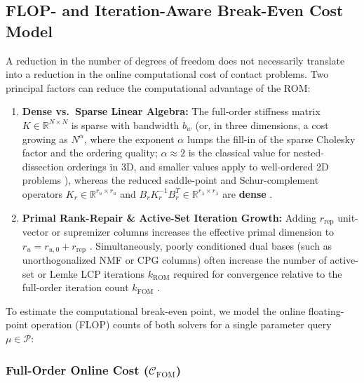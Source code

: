 \documentclass[11pt,a4paper]{article}
\providecommand{\tightlist}{\setlength{\itemsep}{0pt}\setlength{\parskip}{0pt}}
\begin{document}
\hypertarget{flop--and-iteration-aware-break-even-cost-model}{%
\subsection{FLOP- and Iteration-Aware Break-Even Cost Model}\label{flop--and-iteration-aware-break-even-cost-model}}

A reduction in the number of degrees of freedom does not necessarily translate into a reduction in the online computational cost of contact problems. Two principal factors can reduce the computational advantage of the ROM:
\begin{enumerate}
\tightlist
\item \textbf{Dense vs.~Sparse Linear Algebra:} The full-order stiffness matrix \(K \in \mathbb{R}^{N \times N}\) is sparse with bandwidth \(b_w\) (or, in three dimensions, a cost growing as \(N^\alpha\), where the exponent \(\alpha\) lumps the fill-in of the sparse Cholesky factor and the ordering quality; \(\alpha \approx 2\) is the classical value for nested-dissection orderings in 3D, and smaller values apply to well-ordered 2D problems \cite{george1973nested, lipton1979generalized, davis2016survey, franceschini2022block}), whereas the reduced saddle-point and Schur-complement operators \(K_r \in \mathbb{R}^{r_u \times r_u}\) and \(B_r K_r^{-1} B_r^T \in \mathbb{R}^{r_\lambda \times r_\lambda}\) are \textbf{dense} \cite{balajewicz2016projection, leberre2022condition}.
\item \textbf{Primal Rank-Repair \& Active-Set Iteration Growth:} Adding \(r_{\text{rep}}\) unit-vector or supremizer columns increases the effective primal dimension to \(r_u = r_{u,0} + r_{\text{rep}}\) \cite{leberre2022condition, rozza2013reduced, rozza2007stability, gerner2012certified, ballarin2015supremizer}. Simultaneously, poorly conditioned dual bases (such as unorthogonalized NMF or CPG columns) often increase the number of active-set or Lemke LCP iterations \(k_{\text{ROM}}\) required for convergence relative to the full-order iteration count \(k_{\text{FOM}}\) \cite{leberre2022condition, pawar2025efficient}.
\end{enumerate}

To estimate the computational break-even point, we model the online floating-point operation (FLOP) counts of both solvers for a single parameter query \(\mu \in \mathcal{P}\):

\hypertarget{full-order-online-cost-mathcalc_textfom}{%
\subsubsection{\texorpdfstring{Full-Order Online Cost (\(\mathcal{C}_{\text{FOM}}\))}{Full-Order Online Cost (\textbackslash mathcal\{C\}\_\{\textbackslash text\{FOM\}\})}}\label{full-order-online-cost-mathcalc_textfom}}
\end{document}
